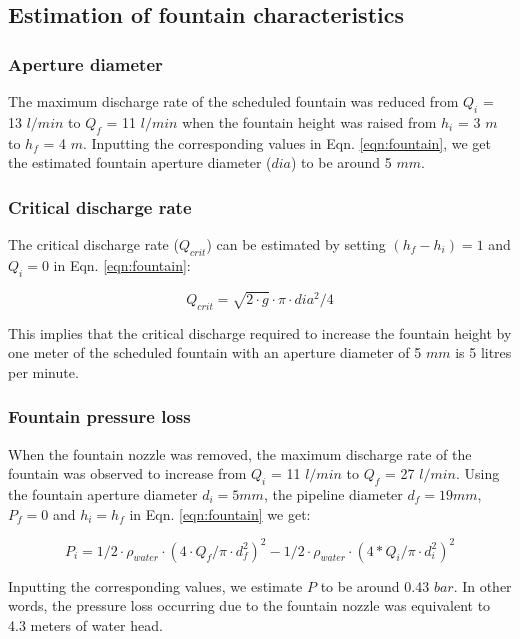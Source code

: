 \documentclass[tc, manuscript]{copernicus}
\begin{document}
\subsection{Estimation of fountain characteristics}

\subsubsection{Aperture diameter}

The maximum discharge rate of the scheduled fountain was reduced from $Q_i$ =  13 $l/min$ to $Q_f$ = 11 $l/min$
when the fountain height was raised from  $h_i$ = 3 $m$ to $h_f$ = 4 $m$. Inputting the corresponding values in
Eqn. \ref{eqn:fountain}, we get the estimated fountain aperture diameter ($dia$) to be around 5 $mm$. 


\subsubsection{Critical discharge rate}

The critical discharge rate ($Q_{crit}$) can be estimated by setting $(h_f - h_i) = 1$ and $Q_i=0$ in Eqn.
\ref{eqn:fountain}: 

\begin{equation}
  Q_{crit} = \sqrt{2 \cdot g } \cdot \pi \cdot dia^2/4
\end{equation}

This implies that the critical discharge required to increase the fountain height by one meter of the scheduled
fountain with an aperture diameter of 5 $mm$ is 5 litres per minute.

\subsubsection{Fountain pressure loss}

When the fountain nozzle was removed, the maximum discharge rate of the fountain was observed to increase from
$Q_{i}$ = 11 $l/min$ to $Q_{f}$ = 27 $l/min$. Using the fountain aperture diameter $d_i = 5 mm$, the pipeline
diameter $d_f = 19 mm$, $P_{f} = 0$ and $h_{i} = h_{f}$ in Eqn. \ref{eqn:fountain} we get: 

\begin{equation}
  P_{i} = 1/2 \cdot \rho_{water} \cdot (4 \cdot Q_f/\pi \cdot d_f^2)^2 - 1/2 \cdot \rho_{water} \cdot (4 * Q_i/\pi \cdot d_i^2)^2
\end{equation}

Inputting the corresponding values, we estimate $P$ to be around 0.43 $bar$. In other words, the pressure loss
occurring due to the fountain nozzle was equivalent to 4.3 meters of water head.
\end{document}
